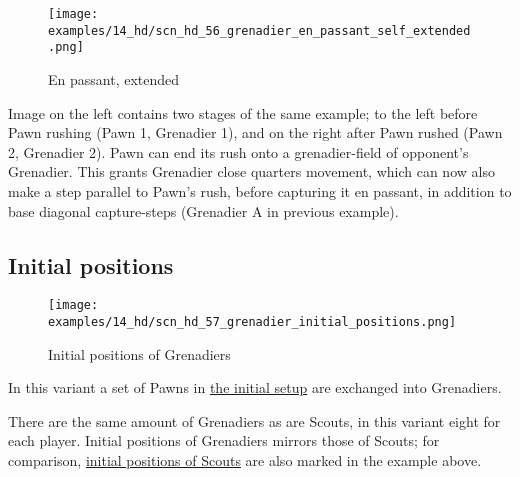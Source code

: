 \vspace*{3.1\baselineskip}
\noindent
\begin{wrapfigure}[15]{l}{0.4\textwidth}
\centering
\texttt{[image: examples/14\_hd/scn\_hd\_56\_grenadier\_en\_passant\_self\_extended.png]}
\vspace*{-1.4\baselineskip}
\caption{En passant, extended}
\label{fig:scn_hd_56_grenadier_en_passant_self_extended}
\end{wrapfigure}
Image on the left contains two stages of the same example; to the left before Pawn
rushing (Pawn 1, Grenadier 1), and on the right after Pawn rushed (Pawn 2, Grenadier
2). \newline
\indent
Pawn can end its rush onto a grenadier-field of opponent's Grenadier. This grants
Grenadier close quarters movement, which can now also make a step parallel to Pawn's
rush, before capturing it en passant, in addition to base diagonal capture-steps
(Grenadier A in previous example).

\clearpage %

\subsection*{Initial positions}
\label{sec:Hemera's Dawn/Grenadier/Initial positions}

\vspace*{-1.2\baselineskip}
\noindent
\begin{figure}[!h]
\texttt{[image: examples/14\_hd/scn\_hd\_57\_grenadier\_initial\_positions.png]}
\vspace*{-1.3\baselineskip}
\caption{Initial positions of Grenadiers}
\label{fig:scn_hd_57_grenadier_initial_positions}
\end{figure}

\vspace*{-0.5\baselineskip}
In this variant a set of Pawns in
\hyperref[fig:14_hemera_s_dawn]{the initial setup} are exchanged into Grenadiers.

There are the same amount of Grenadiers as are Scouts, in this variant eight for
each player. Initial positions of Grenadiers mirrors those of Scouts; for comparison,
\hyperref[fig:scn_hd_39_scout_initial_positions]{initial positions of Scouts} are
also marked in the example above.

\clearpage %

